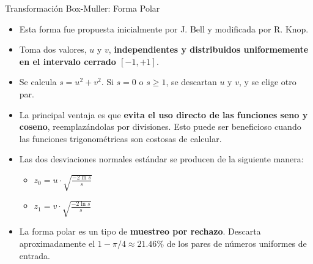 \documentclass{beamer}
\begin{document}
\begin{frame}{Transformación Box-Muller: Forma Polar}
    \begin{itemize}
        \item Esta forma fue propuesta inicialmente por J. Bell y modificada por R. Knop.
        \item Toma dos valores, $u$ y $v$, \textbf{independientes y distribuidos uniformemente en el intervalo cerrado $[-1, +1]$}.
        \item Se calcula $s = u^2 + v^2$. Si $s=0$ o $s \geq 1$, se descartan $u$ y $v$, y se elige otro par.
        \item La principal ventaja es que \textbf{evita el uso directo de las funciones seno y coseno}, reemplazándolas por divisiones. Esto puede ser beneficioso cuando las funciones trigonométricas son costosas de calcular.
        \item Las dos desviaciones normales estándar se producen de la siguiente manera:
            \begin{itemize}
                \item $z_0 = u \cdot \sqrt{\frac{-2\ln s}{s}}$
                \item $z_1 = v \cdot \sqrt{\frac{-2\ln s}{s}}$
            \end{itemize}
        \item La forma polar es un tipo de \textbf{muestreo por rechazo}. Descarta aproximadamente el $1 - \pi/4 \approx 21.46\%$ de los pares de números uniformes de entrada.
    \end{itemize}
\end{frame}
\end{document}
